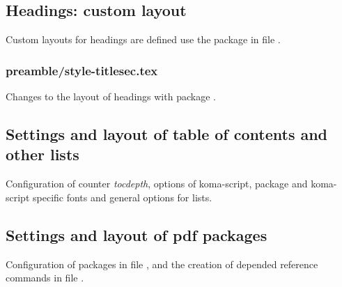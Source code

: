 \subsection{Headings: custom layout}
\label{sec:style:headings:custom}

Custom layouts for headings are defined use the package  in file .


\subsubsection{preamble/style-titlesec.tex}

Changes to the layout of headings with package . 


\subsection{Settings and layout of table of contents and other lists}
\label{sec:style:toc}

Configuration of counter \emph{tocdepth}, options of koma-script, package  and koma-script specific fonts and general options for lists.


\subsection{Settings and layout of pdf packages}
\label{sec:style:pdf}

Configuration of packages  in file ,  and the creation of  depended reference commands in file .


